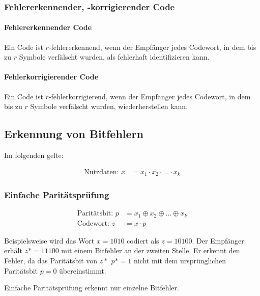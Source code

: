 \documentclass[a4paper, 14pt]{article}
\begin{document}
	\subsubsection{Fehlererkennender, -korrigierender Code}

	\paragraph{Fehlererkennender Code}

	Ein Code ist $r$-fehlererkennend, wenn der Empfänger jedes Codewort, in dem bis zu $r$ Symbole verfälscht wurden, als fehlerhaft identifizieren kann.

	\paragraph{Fehlerkorrigierender Code}

	Ein Code ist $r$-fehlerkorrigierend, wenn der Empfänger jedes Codewort, in dem bis zu $r$ Symbole verfälscht wurden, wiederherstellen kann.


	\subsection{Erkennung von Bitfehlern}

	Im folgenden gelte:

	\begin{align*}
		\text{Nutzdaten: } x &= x_1 \cdot x_2 \cdot ... \cdot x_k
	\end{align*}

	\subsubsection{Einfache Paritätsprüfung}

	\begin{align*}
		\text{Paritätsbit: } p &= x_1 \oplus x_2 \oplus ... \oplus x_k \\
		\text{Codewort: } z &= x \cdot p
	\end{align*}

	Beispielsweise wird das Wort $x = 1010$ codiert als $z = 10100$.
	Der Empfänger erhält $z* = 11100$ mit einem Bitfehler an der zweiten Stelle.
	Er erkennt den Fehler, da das Paritätsbit von $z*$ $p* = 1$ nicht mit dem ursprünglichen Paritätsbit $p = 0$ übereinstimmt.

	Einfache Paritätsprüfung erkennt nur einzelne Bitfehler.
\end{document}
